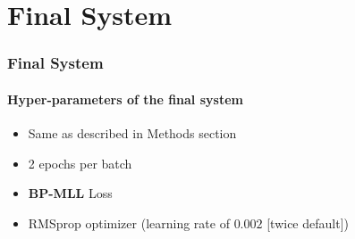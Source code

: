 \newcommand{\fisys}{Final System}
\section{\fisys}

\begin{frame}
	\frametitle{\fisys}
	\framesubtitle{Hyper-parameters of the final system}
	\begin{itemize}
		\item Same as described in Methods section
		\item 2 epochs per batch
		\item \textbf{BP-MLL} Loss
		\item RMSprop optimizer
			(learning rate of $0.002$ [twice default])
	\end{itemize}
\end{frame}

